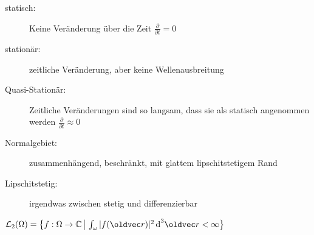 \documentclass[6pt,a4paper]{scrartcl}
\let\vec\oldvec
\begin{document}
\begin{multicols}{4}
	\begin{description}
		\item[statisch:] Keine Veränderung über die Zeit $\frac{\partial}{\partial t} = 0$
		\item[stationär:] zeitliche Veränderung, aber keine Wellenausbreitung
		\item[Quasi-Stationär:] Zeitliche Veränderungen sind so langsam, dass sie als statisch angenommen werden $\frac{\partial}{\partial t} \approx 0$
		\item[Normalgebiet:] zusammenhängend, beschränkt, mit glattem lipschitstetigem Rand
		\item[Lipschitstetig:] irgendwas zwischen stetig und differenzierbar
	\end{description}
	$\mathcal L_2(\Omega) = \iset{f:\Omega \ra \C}{\int_\omega |f(\vec r)|^2 \diff^3 \vec r < \infty }$\\
	
	
\newpage
	








\end{multicols}

\end{document}
